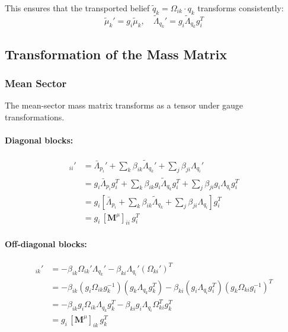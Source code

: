 \documentclass[12pt]{article}
\begin{document}
This ensures that the transported belief $\tilde{q}_k = \Omega_{ik}\cdot q_k$ transforms consistently:
\begin{equation}
\tilde{\mu}_k' = g_i \tilde{\mu}_k, \quad \tilde{\Lambda}_{q_k}' = g_i \tilde{\Lambda}_{q_k} g_i^T
\end{equation}

\subsection{Transformation of the Mass Matrix}

\subsubsection{Mean Sector}

The mean-sector mass matrix transforms as a tensor under gauge transformations.

\paragraph{Diagonal blocks:}
\begin{align}
[\mathbf{M}^\mu]_{ii}' &= \bar{\Lambda}_{p_i}' + \sum_k \beta_{ik}\tilde{\Lambda}_{q_k}' + \sum_j \beta_{ji}\Lambda_{q_i}' \nonumber\\
&= g_i\bar{\Lambda}_{p_i} g_i^T + \sum_k \beta_{ik} g_i\tilde{\Lambda}_{q_k} g_i^T + \sum_j \beta_{ji} g_i\Lambda_{q_i} g_i^T \nonumber\\
&= g_i \left[\bar{\Lambda}_{p_i} + \sum_k \beta_{ik}\tilde{\Lambda}_{q_k} + \sum_j \beta_{ji}\Lambda_{q_i}\right] g_i^T \nonumber\\
&= g_i \, [\mathbf{M}^\mu]_{ii} \, g_i^T
\end{align}

\paragraph{Off-diagonal blocks:}
\begin{align}
[\mathbf{M}^\mu]_{ik}' &= -\beta_{ik}\Omega_{ik}'\Lambda_{q_k}' - \beta_{ki}\Lambda_{q_i}'(\Omega_{ki}')^T \nonumber\\
&= -\beta_{ik}(g_i\Omega_{ik}g_k^{-1})(g_k\Lambda_{q_k} g_k^T) - \beta_{ki}(g_i\Lambda_{q_i} g_i^T)(g_k\Omega_{ki}g_i^{-1})^T \nonumber\\
&= -\beta_{ik} g_i\Omega_{ik}\Lambda_{q_k} g_k^T - \beta_{ki} g_i\Lambda_{q_i}\Omega_{ki}^T g_k^T \nonumber\\
&= g_i \, [\mathbf{M}^\mu]_{ik} \, g_k^T
\end{align}
\end{document}
